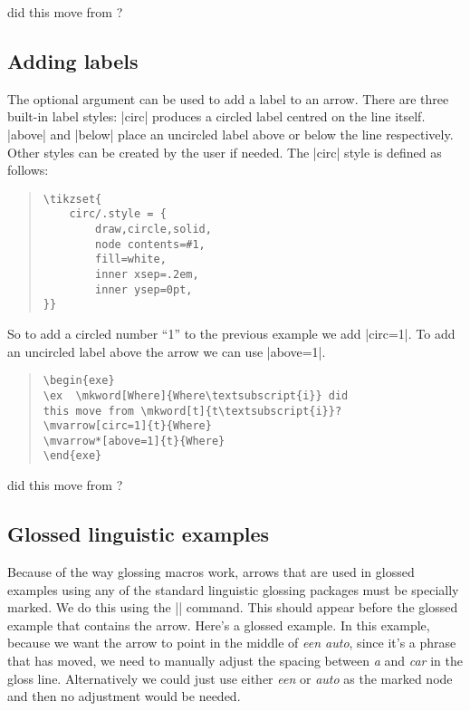 \documentclass[11pt]{article}
\begin{document}
\begin{exe}
\ex  {} did this move from ?
\label{where2}
\end{exe}
\subsection{Adding labels}
The optional argument can be used to add a label to an arrow.  There are three built-in label styles:  |circ| produces a circled label centred on the line itself. |above| and |below| place an uncircled label above or below the line respectively. Other styles can be created by the user if needed.  The |circ| style is defined as follows:

\begin{quote}
\begin{lstlisting}
\tikzset{
	circ/.style = {
  		draw,circle,solid,
  		node contents=#1,
  		fill=white,
  		inner xsep=.2em,
  		inner ysep=0pt,
}}
\end{lstlisting}
\end{quote}

So to add a circled number “1” to the previous example we add |circ=1|. To add an uncircled label above the arrow we can use |above=1|.

\begin{quote}
\begin{lstlisting}
\begin{exe}
\ex  \mkword[Where]{Where\textsubscript{i}} did 
this move from \mkword[t]{t\textsubscript{i}}?
\mvarrow[circ=1]{t}{Where}
\mvarrow*[above=1]{t}{Where}
\end{exe}
\end{lstlisting}
\end{quote}

\begin{exe}
\arrowstrut
\ex  {} did 
this move from ?

\end{exe}

\subsection{Glossed linguistic examples}
Because of the way glossing macros work, arrows that are used in glossed examples using any of the standard linguistic glossing packages must be specially marked. We do this using the |\arrowgloss| command. This should appear before the glossed example that contains the arrow.  Here’s a glossed example. In this example, because we want the arrow to point in the middle of \emph{een auto}, since it’s a phrase that has moved, we need to manually adjust the spacing between \emph{a} and \emph{car} in the gloss line. Alternatively we could just use either \emph{een} or \emph{auto} as the marked node and then no adjustment would be needed. 
\end{document}
